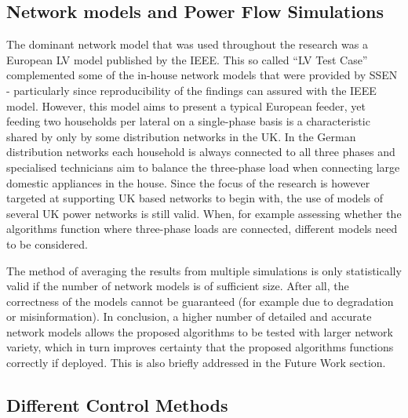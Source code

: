 \subsection{Network models and Power Flow Simulations}

The dominant network model that was used throughout the research was a European LV model published by the IEEE.
This so called ``LV Test Case'' complemented some of the in-house network models that were provided by SSEN - particularly since reproducibility of the findings can assured with the IEEE model.
However, this model aims to present a typical European feeder, yet feeding two households per lateral on a single-phase basis is a characteristic shared by only by some distribution networks in the UK.
In the German distribution networks each household is always connected to all three phases and specialised technicians aim to balance the three-phase load when connecting large domestic appliances in the house.
Since the focus of the research is however targeted at supporting UK based networks to begin with, the use of models of several UK power networks is still valid.
When, for example assessing whether the algorithms function where three-phase loads are connected, different models need to be considered.

The method of averaging the results from multiple simulations is only statistically valid if the number of network models is of sufficient size.
After all, the correctness of the models cannot be guaranteed (for example due to degradation or misinformation).
In conclusion, a higher number of detailed and accurate network models allows the proposed algorithms to be tested with larger network variety, which in turn improves certainty that the proposed algorithms functions correctly if deployed.
This is also briefly addressed in the Future Work section.

\subsection{Different Control Methods}

